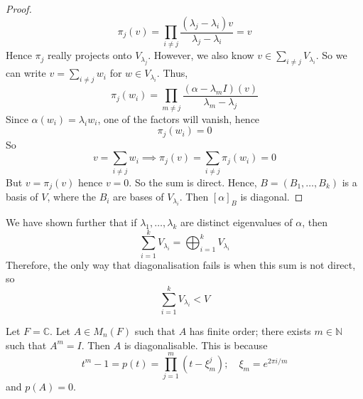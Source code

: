 \begin{proof}
	\[
		\pi_j(v) = \prod_{i \neq j} \frac{(\lambda_j - \lambda_i)v}{\lambda_j - \lambda_i} = v
	\]
	Hence \( \pi_j \) really projects onto \( V_{\lambda_j} \).
	However, we also know \( v \in \sum_{i \neq j} V_{\lambda_i} \).
	So we can write \( v = \sum_{i \neq j} w_i \) for \( w \in V_{\lambda_i} \).
	Thus,
	\[
		\pi_j(w_i) = \prod_{m \neq j} \frac{(\alpha - \lambda_m I)(v)}{\lambda_m - \lambda_j}
	\]
	Since \( \alpha(w_i) = \lambda_i w_i \), one of the factors will vanish, hence
	\[
		\pi_j(w_i) = 0
	\]
	So
	\[
		v = \sum_{i \neq j} w_i \implies \pi_j(v) = \sum_{i \neq j} \pi_j(w_i) = 0
	\]
	But \( v = \pi_j(v) \) hence \( v = 0 \).
	So the sum is direct.
	Hence, \( B = (B_1, \dots, B_k) \) is a basis of \( V \), where the \( B_i \) are bases of \( V_{\lambda_i} \).
	Then \( [\alpha]_B \) is diagonal.
\end{proof}
\begin{remark}
	We have shown further that if \( \lambda_1, \dots, \lambda_k \) are distinct eigenvalues of \( \alpha \), then
	\[
		\sum_{i=1}^k V_{\lambda_i} = \bigoplus_{i=1}^k V_{\lambda_i}
	\]
	Therefore, the only way that diagonalisation fails is when this sum is not direct, so
	\[
		\sum_{i=1}^k V_{\lambda_i} < V
	\]
\end{remark}
\begin{example}
	Let \( F = \mathbb C \).
	Let \( A \in M_n(F) \) such that \( A \) has finite order; there exists \( m \in \mathbb N \) such that \( A^m = I \).
	Then \( A \) is diagonalisable.
	This is because
	\[
		t^m - 1 = p(t) = \prod_{j=1}^m (t - \xi_m^j);\quad \xi_m = e^{2 \pi i/m}
	\]
	and \( p(A) = 0 \).
\end{example}

